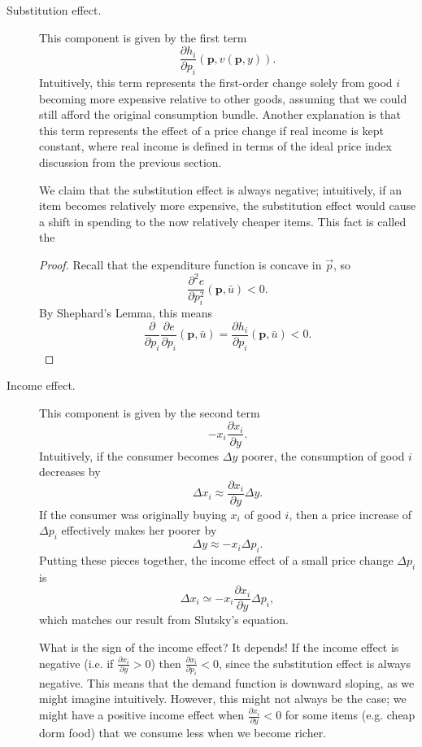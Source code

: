 \begin{description}

\item[Substitution effect.] This component is given by the first term
$$\frac{\partial h_{i}}{\partial p_{i}}(\mathbf{p}, v(\mathbf{p}, y)).$$
Intuitively, this term represents the first-order change solely from good $i$ becoming more expensive relative to other goods, assuming that we could still afford the original consumption bundle. Another explanation is that this term represents the effect of a price change if real income is kept constant, where real income is defined in terms of the ideal price index discussion from the previous section.

We claim that the substitution effect is always negative; intuitively, if an item becomes relatively more expensive, the substitution effect would cause a shift in spending to the now relatively cheaper items. This fact is called the 
\begin{proof}
Recall that the expenditure function is concave in $\vec{p}$, so 
$$
\frac{\partial^{2} e}{\partial p_{i}^{2}}(\mathbf{p}, \bar{u})<0.
$$
By Shephard's Lemma, this means
$$
\frac{\partial}{\partial p_{i}} \frac{\partial e}{\partial p_{i}}(\mathbf{p}, \bar{u})=\frac{\partial h_{i}}{\partial p_{i}}(\mathbf{p}, \bar{u})<0.
$$
\end{proof}

\item[Income effect.] This component is given by the second term
$$-x_{i} \frac{\partial x_{i}}{\partial y}.$$
Intuitively, if the consumer becomes $\Delta y$ poorer, the consumption of good $i$ decreases by 
$$
\Delta x_{i} \approx \frac{\partial x_{i}}{\partial y} \Delta y.
$$
If the consumer was originally buying $x_i$ of good $i$, then a price increase of $\Delta p_i$ effectively makes her poorer by
$$
\Delta y \approx -x_{i} \Delta p_{i}.
$$
Putting these pieces together, the income effect of a small price change $\Delta p_i$ is 
$$
\Delta x_{i} \simeq-x_{i} \frac{\partial x_{i}}{\partial y} \Delta p_{i},
$$
which matches our result from Slutsky's equation.

What is the sign of the income effect? It depends! If the income effect is negative (i.e. if $\frac{\partial x_{i}}{\partial y}>0$) then $\frac{\partial x_{i}}{\partial p_{i}}<0$, since the substitution effect is always negative. This means that the demand function is downward sloping, as we might imagine intuitively. However, this might not always be the case; we might have a positive income effect when $\frac{\partial x_{i}}{\partial y}<0$ for some items (e.g. cheap dorm food) that we consume less when we become richer. 

\end{description} 

